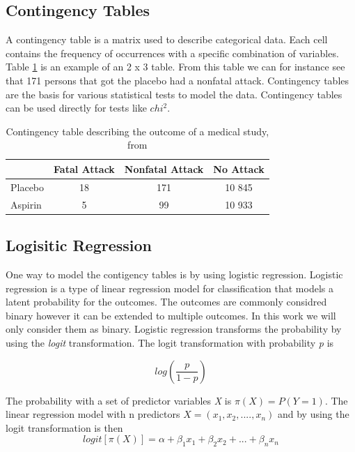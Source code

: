 \documentclass[10pt,a4paper]{report}
\begin{document}
\subsection{Contingency Tables}
A contingency table is a matrix used to describe categorical data. Each cell contains the frequency of occurrences with a specific combination of variables. Table \ref{table:contingency_table} is an example of an 2 x 3 table. From this table we can for instance see that 171 persons that got the placebo had a nonfatal attack. Contingency tables are the basis for various statistical tests to model the data. Contingency tables can be used directly for tests like $chi^2$.\cite{agresti_categorical}

\begin{table}[h]
\begin{tabular}{ l c c c }
  \hline
  & Fatal Attack & Nonfatal Attack & No Attack\\
  \hline
  Placebo & 18 & 171 & 10 845 \\
  Aspirin & 5 & 99 & 10 933 \\
  \hline  
\end{tabular}
\caption{Contingency table describing the outcome of a medical study, from \cite{agresti_categorical}}
\label{table:contingency_table}
\end{table}

\subsection{Logisitic Regression}
One way to model the contigency tables is by using logistic regression. Logistic regression is a type of linear regression model for classification that models a latent probability for the outcomes. The outcomes are commonly considred binary however it can be extended to multiple outcomes. In this work we will only consider them as binary. Logistic regression transforms the probability by using the \emph{logit} transformation. The logit transformation with probability \emph{p} is 

\begin{equation}
log(\frac{p}{1-p})
\end{equation}


The probability with a set of predictor variables \emph{X} is $\pi(X)=P(Y=1)$. The linear regression model with n predictors $X=(x_1,x_2,....,x_n)$ and by using the logit transformation is then
\begin{equation}
logit[\pi(X)]=\alpha+\beta_1 x_1+\beta_2 x_2+...+\beta_n x_n
\end{equation}
\end{document}
